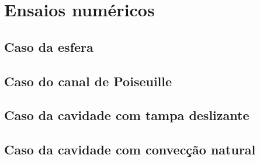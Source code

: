 \chapter[Ensaios numéricos]{Ensaios numéricos}

\section{Caso da esfera}
\section{Caso do canal de Poiseuille}
\section{Caso da cavidade com tampa deslizante}
\section{Caso da cavidade com convecção natural}